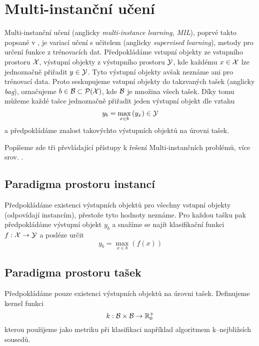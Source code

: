 \chapter{Multi-instanční učení}
Multi-instanční učení (anglicky \textenglish{\textit{multi-instance learning, MIL}}), poprvé takto popsané v \cite{dietterich_solving_1997}, je variací učení s učitelem (anglicky \textenglish{\textit{supervised learning}}), metody pro určení funkce z trénovacích dat. Předpokládáme vstupní objekty ze vstupního prostoru \( \mathcal X \), výstupní objekty z výstupního prostoru \( \mathcal Y \), kde každému \( x \in \mathcal X \) lze jednoznačně přiřadit \( y \in \mathcal Y \). Tyto výstupní objekty avšak neznáme ani pro trénovací data. Proto seskupujeme vstupní objekty do takzvaných tašek (anglicky \textenglish{\textit{bag}}), označujeme \( b \in \mathcal B \subset \mathcal P ( \mathcal X ) \), kde \( \mathcal B \) je množina všech tašek. Díky tomu můžeme každé tašce jednoznačně přiřadit jeden výstupní objekt dle vztahu
\begin{equation}\label{baglabel}
	y_b = \max_{x \in b} \left( y_x \right) \in \mathcal Y
\end{equation}
a předpokládáme znalost takovýchto výstupních objektů na úrovni tašek. 

Popíšeme zde tři převládající přístupy k řešení Multi-instančních problémů, více srov. \cite{pevny_using_2016}.

\section{Paradigma prostoru instancí}
Předpokládáme existenci výstupních objektů pro všechny vstupní objekty (odpovídají instancím), přestože tyto hodnoty neznáme. Pro každou tašku pak předpokládáme výstupní objekt \( y_b \) a snažíme se najít klasifikační funkci \( f : \mathcal X \to \mathcal Y \) a posléze určit
\begin{equation}
	y_b = \max_{x \in b} \left( f \left( x \right) \right)
\end{equation}

\section{Paradigma prostoru tašek}
Předpokládáme pouze existenci výstupních objektů na úrovni tašek. Definujeme kernel funkci
\begin{equation}
	k : \mathcal B \times \mathcal B \to \mathbb R_0^+
\end{equation}
kterou použijeme jako metriku při klasifikaci například algoritmem k--nejbližsích sousedů.


